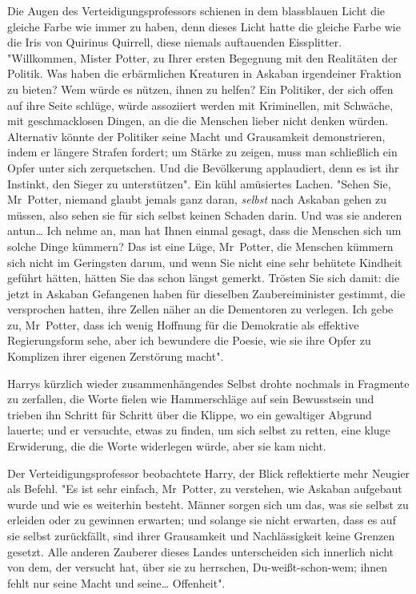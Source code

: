 {Die Augen des Verteidigungsprofessors schienen in dem blassblauen Licht die gleiche Farbe wie immer zu haben, denn dieses Licht hatte die gleiche Farbe wie die Iris von Quirinus Quirrell, diese niemals auftauenden Eissplitter. "Willkommen, Mister Potter, zu Ihrer ersten Begegnung mit den Realitäten der Politik. Was haben die erbärmlichen Kreaturen in Askaban irgendeiner Fraktion zu bieten? Wem würde es nützen, ihnen zu helfen? Ein Politiker, der sich offen auf ihre Seite schlüge, würde assoziiert werden mit Kriminellen, mit Schwäche, mit geschmacklosen Dingen, an die die Menschen lieber nicht denken würden. Alternativ könnte der Politiker seine Macht und Grausamkeit demonstrieren, indem er längere Strafen fordert; um Stärke zu zeigen, muss man schließlich ein Opfer unter sich zerquetschen. Und die Bevölkerung applaudiert, denn es ist ihr Instinkt, den Sieger zu unterstützen". Ein kühl amüsiertes Lachen. "Sehen Sie, Mr~Potter, niemand glaubt jemals ganz daran, \emph{selbst} nach Askaban gehen zu müssen, also sehen sie für sich selbst keinen Schaden darin. Und was sie anderen antun… Ich nehme an, man hat Ihnen einmal gesagt, dass die Menschen sich um solche Dinge kümmern? Das ist eine Lüge, Mr~Potter, die Menschen kümmern sich nicht im Geringsten darum, und wenn Sie nicht eine sehr behütete Kindheit geführt hätten, hätten Sie das schon längst gemerkt. Trösten Sie sich damit: die jetzt in Askaban Gefangenen haben für dieselben Zaubereiminister gestimmt, die versprochen hatten, ihre Zellen näher an die Dementoren zu verlegen. Ich gebe zu, Mr~Potter, dass ich wenig Hoffnung für die Demokratie als effektive Regierungsform sehe, aber ich bewundere die Poesie, wie sie ihre Opfer zu Komplizen ihrer eigenen Zerstörung macht".

Harrys kürzlich wieder zusammenhängendes Selbst drohte nochmals in Fragmente zu zerfallen, die Worte fielen wie Hammerschläge auf sein Bewusstsein und trieben ihn Schritt für Schritt über die Klippe, wo ein gewaltiger Abgrund lauerte; und er versuchte, etwas zu finden, um sich selbst zu retten, eine kluge Erwiderung, die die Worte widerlegen würde, aber sie kam nicht.

Der Verteidigungsprofessor beobachtete Harry, der Blick reflektierte mehr Neugier als Befehl. "Es ist sehr einfach, Mr~Potter, zu verstehen, wie Askaban aufgebaut wurde und wie es weiterhin besteht. Männer sorgen sich um das, was sie selbst zu erleiden oder zu gewinnen erwarten; und solange sie nicht erwarten, dass es auf sie selbst zurückfällt, sind ihrer Grausamkeit und Nachlässigkeit keine Grenzen gesetzt. Alle anderen Zauberer dieses Landes unterscheiden sich innerlich nicht von dem, der versucht hat, über sie zu herrschen, Du-weißt-schon-wem; ihnen fehlt nur seine Macht und seine… Offenheit".

}
